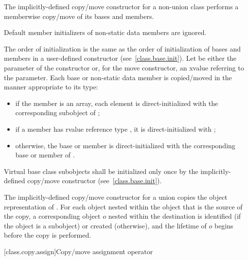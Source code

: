\pnum
The implicitly-defined copy/move constructor for a non-union class
performs a memberwise copy/move of its bases and members.
\begin{note}
Default member initializers of non-static data members are ignored.
\end{note}
The order of initialization is the same as the order of initialization of bases
and members in a user-defined constructor (see~\ref{class.base.init}).
Let  be either the parameter of the constructor or, for the move constructor, an
xvalue referring to the parameter.
Each base or non-static data member
is copied/moved in the manner appropriate to its type:
\begin{itemize}
\item
if the member is an array, each element is
direct-initialized with the corresponding subobject of ;

\item
if a member  has rvalue reference type , it is direct-initialized with
;

\item
otherwise, the base or member is direct-initialized with the corresponding base or member of .
\end{itemize}

%
Virtual base class subobjects shall be initialized only once by
the implicitly-defined copy/move constructor (see~\ref{class.base.init}).

\pnum
The implicitly-defined copy/move constructor for a union
 copies the object representation of .
For each object nested within
the object that is the source of the copy,
a corresponding object $o$ nested within the destination
is identified (if the object is a subobject) or created (otherwise),
and the lifetime of $o$ begins before the copy is performed.

[class.copy.assign]{Copy/move assignment operator}%

